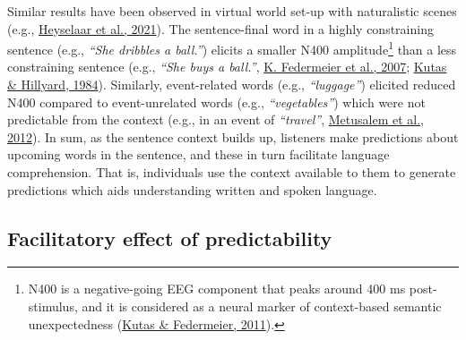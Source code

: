 \documentclass[a4paper, nobind]{templates/ociamthesis}
\begin{document}
Similar results have been observed in virtual world set-up with naturalistic scenes (e.g., \protect\hyperlink{ref-Heyselaar2021}{Heyselaar et al., 2021}).
The sentence-final word in a highly constraining sentence (e.g., \emph{``She dribbles a ball.''}) elicits a smaller N400 amplitude\footnote{N400 is a negative-going EEG component that peaks around 400 ms post-stimulus, and it is considered as a neural marker of context-based semantic unexpectedness (\protect\hyperlink{ref-Kutas2011}{Kutas \& Federmeier, 2011}).} than a less constraining sentence (e.g., \emph{``She buys a ball.''}, \protect\hyperlink{ref-Federmeier2007}{K. Federmeier et al., 2007}; \protect\hyperlink{ref-Kutas1984}{Kutas \& Hillyard, 1984}).
Similarly, event-related words (e.g., \emph{``luggage''}) elicited reduced N400 compared to event-unrelated words (e.g., \emph{``vegetables''}) which were not predictable from the context (e.g., in an event of \emph{``travel''}, \protect\hyperlink{ref-Metusalem2012}{Metusalem et al., 2012}).
In sum, as the sentence context builds up, listeners make predictions about upcoming words in the sentence, and these in turn facilitate language comprehension.
That is, individuals use the context available to them to generate predictions which aids understanding written and spoken language.

\hypertarget{background-facilitatory-effect}{%
\subsection{Facilitatory effect of predictability}\label{background-facilitatory-effect}}
\end{document}
